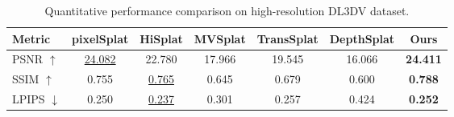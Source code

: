 \begin{table}
    \centering
    \caption{Quantitative performance comparison on high-resolution DL3DV dataset.}
    \label{table:native_hq}
   \begin{tabular}{l|cc|cccc}
    \toprule
    Metric & pixelSplat & HiSplat & MVSplat & TransSplat & DepthSplat & Ours \\
    \midrule
    PSNR $\uparrow$   & \underline{24.082} & 22.780 & 17.966 & 19.545 & 16.066 & \textbf{24.411} \\
    SSIM $\uparrow$   & 0.755  & \underline{0.765}  & 0.645  & 0.679  & 0.600  & \textbf{0.788} \\
    LPIPS $\downarrow$& 0.250  & \underline{0.237}  & 0.301  & 0.257  & 0.424  & \textbf{0.252} \\
    \bottomrule
\end{tabular}

\end{table}

